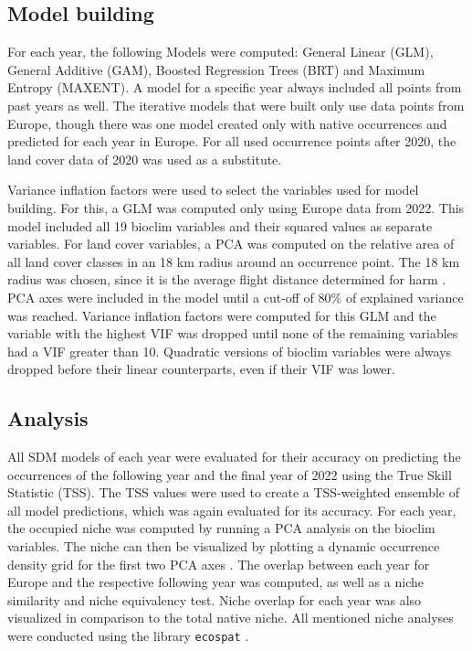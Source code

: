 \documentclass[12pt,a4paper]{article}
\begin{document}
\subsection{Model building}
For each year, the following Models were computed: General Linear (GLM), General Additive (GAM), Boosted Regression Trees (BRT) and Maximum Entropy (MAXENT).
A model for a specific year always included all points from past years as well.
The iterative models that were built only use data points from Europe, though there was one model created only with native occurrences and predicted for each year in Europe.
For all used occurrence points after 2020, the land cover data of 2020 was used as a substitute.

Variance inflation factors were used to select the variables used for model building.
For this, a GLM was computed only using Europe data from 2022.
This model included all 19 bioclim variables and their squared values as separate variables.
For land cover variables, a PCA was computed on the relative area of all land cover classes in an 18 km radius around an occurrence point.
The 18 km radius was chosen, since it is the average flight distance determined for \gls{harm} \autocite{jeffries2013flightharmonia}.
PCA axes were included in the model until a cut-off of 80\% of explained variance was reached.
Variance inflation factors were computed for this GLM and the variable with the highest VIF was dropped until none of the remaining variables had a VIF greater than 10. 
Quadratic versions of bioclim variables were always dropped before their linear counterparts, even if their VIF was lower.

\subsection{Analysis}
All SDM models of each year were evaluated for their accuracy on predicting the occurrences of the following year and the final year of 2022 using the True Skill Statistic (TSS).
The TSS values were used to create a TSS-weighted ensemble of all model predictions, which was again evaluated for its accuracy.
For each year, the occupied niche was computed by running a PCA analysis on the bioclim variables.
The niche can then be visualized by plotting a dynamic occurrence density grid for the first two PCA axes \autocite{broennimann2012niche}.
The overlap between each year for Europe and the respective following year was computed, as well as a niche similarity and niche equivalency test.
Niche overlap for each year was also visualized in comparison to the total native niche.
All mentioned niche analyses were conducted using the library \texttt{ecospat} \autocite{dicola2017ecospat}.
\end{document}
